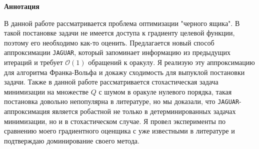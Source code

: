 \begin{center}
    \Large{\textbf{Аннотация}}
\end{center}

    В данной работе рассматривается проблема оптимизации "черного ящика". В такой постановке задачи не имеется доступа к градиенту целевой функции, поэтому его необходимо как-то оценить. Предлагается новый способ аппроксимации \texttt{JAGUAR}, который запоминает информацию из предыдущих итераций и требует $\mathcal{O}(1)$ обращений к оракулу. Я реализую эту аппроксимацию для алгоритма Франка-Вольфа и докажу сходимость для выпуклой постановки задачи. Также в данной работе рассматривается стохастическая задача минимизации на множестве $Q$ с шумом в оракуле нулевого порядка, такая постановка довольно непопулярна в литературе, но мы доказали, что \texttt{JAGUAR}-аппроксимация является робастной не только в детерминированных задачах минимизации, но и в стохастическом случае. Я провел эксперименты по сравнению моего градиентного оценщика с уже известными в литературе и подтверждаю доминирование своего метода.